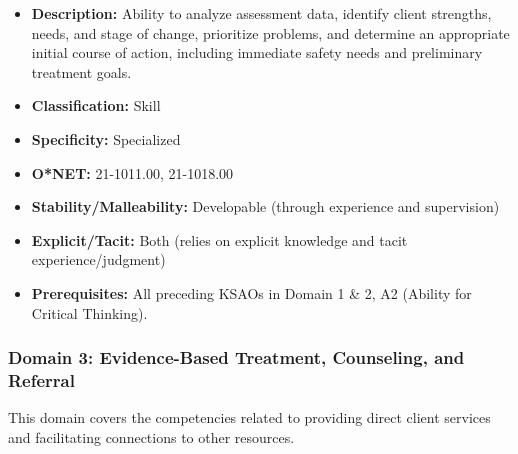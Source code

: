 \documentclass[
  letterpaper,
  DIV=11,
  numbers=noendperiod]{scrartcl}
\providecommand{\tightlist}{%
  \setlength{\itemsep}{0pt}\setlength{\parskip}{0pt}}
\begin{document}
\begin{enumerate}
  \begin{itemize}
  \tightlist
  \item
    \textbf{Description:} Ability to analyze assessment data, identify
    client strengths, needs, and stage of change, prioritize problems,
    and determine an appropriate initial course of action, including
    immediate safety needs and preliminary treatment goals.
  \item
    \textbf{Classification:} Skill
  \item
    \textbf{Specificity:} Specialized
  \item
    \textbf{O*NET:} 21-1011.00, 21-1018.00
  \item
    \textbf{Stability/Malleability:} Developable (through experience and
    supervision)
  \item
    \textbf{Explicit/Tacit:} Both (relies on explicit knowledge and
    tacit experience/judgment)
  \item
    \textbf{Prerequisites:} All preceding KSAOs in Domain 1 \& 2, A2
    (Ability for Critical Thinking).
  \end{itemize}
\end{enumerate}

\subsubsection{Domain 3: Evidence-Based Treatment, Counseling, and
Referral}\label{domain-3-evidence-based-treatment-counseling-and-referral}

This domain covers the competencies related to providing direct client
services and facilitating connections to other resources.
\end{document}
